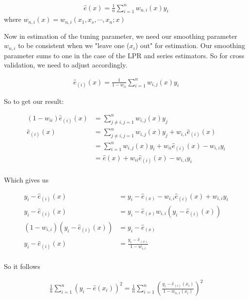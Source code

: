 \documentclass[12pt]{article}
\newcommand{\qsum}{\sum\limits_{i=1}^n}
\begin{document}
\begin{gather*}
\hat{e}(x) = \frac{1}{n} \qsum w_{n,i}(x)y_i
\end{gather*}
where $w_{n,i}(x) = w_{n,i}(x_1, x_s, \cdots, x_n;x)$

Now in estimation of the tuning parameter, we need our smoothing parameter $w_{n,i}$ to be consistent when we "leave one ($x_i$) out" for estimation. Our smoothing parameter sums to one in the case of the LPR and series estimators. So for cross validation, we need to adjust accordingly.


\begin{gather*}
\hat{e}_{(i)}(x) = \frac{1}{1-w_{ii}} \sum\limits_{i=1}^n w_{i,j}(x)y_i
\end{gather*}

So to get our result:

\begin{align*}
(1-w_{ii}) \hat{e}_{(i)}(x) & = \sum\limits_{j\neq i,j=1}^n w_{i,j}(x)y_j \\
\hat{e}_{(i)}(x) &= \sum\limits_{j\neq i,j=1}^n w_{i,j}(x)y_j + w_{i,i}\hat{e}_{(i)}(x) \\
  &= \sum\limits_{i=1}^n w_{i,j}(x)y_i + w_{ii}\hat{e}_{(i)}(x) - w_{i,i}y_i \\
&= \hat{e}(x) + w_{ii}\hat{e}_{(i)}(x) - w_{i,i}y_i \\
\end{align*}

Which gives us

\begin{align*}
y_i - \hat{e}_{(i)}(x) &= y_i - \hat{e}_(x) - w_{i,i}\hat{e}_{(i)}(x) + w_{i,i}y_i\\
y_i - \hat{e}_{(i)}(x) &= y_i - \hat{e}_(x) w_{i,i}(y_i - \hat{e}_{(i)}(x))\\
(1 - w_{i,i}) ( y_i - \hat{e}_{(i)}(x))  &= y_i - \hat{e}_(x)\\
y_i - \hat{e}_{(i)}(x)  &= \frac{y_i - \hat{e}_(x)}{1-w_{i,i}}\\
\end{align*}

So it follows

\begin{gather*}
\frac{1}{n} \sum\limits_{i=1}^n (y_i - \hat{e}(x_i))^2  =  \frac{1}{n} \sum\limits_{i=1}^n \left( \frac{y_i - \hat{e}_{(i)}(x_i)} {1-w_{n,1}(x_i)} \right)^2
\end{gather*}

\subsection{}
\end{document}
